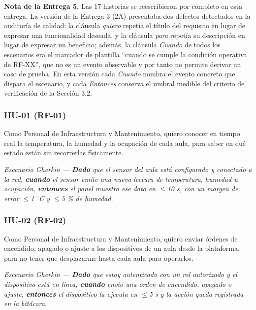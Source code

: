 \textbf{Nota de la Entrega 5.} Las 17 historias se reescribieron por completo en esta entrega. La versión de la Entrega 3 (2A) presentaba dos defectos detectados en la auditoría de calidad: la cláusula \emph{quiero} repetía el título del requisito en lugar de expresar una funcionalidad deseada, y la cláusula \emph{para} repetía su descripción en lugar de expresar un beneficio; además, la cláusula \emph{Cuando} de todos los escenarios era el marcador de plantilla ``cuando se cumple la condición operativa de RF-XX'', que no es un evento observable y por tanto no permite derivar un caso de prueba. En esta versión cada \emph{Cuando} nombra el evento concreto que dispara el escenario, y cada \emph{Entonces} conserva el umbral medible del criterio de verificación de la Sección 3.2.

\subsubsection*{HU-01 (RF-01)}


Como Personal de Infraestructura y Mantenimiento, quiero conocer en tiempo real la temperatura, la humedad y la ocupación de cada aula, para saber en qué estado están sin recorrerlas físicamente.

\textit{Escenario Gherkin --- \textbf{Dado} que el sensor del aula está configurado y conectado a la red, \textbf{cuando} el sensor emite una nueva lectura de temperatura, humedad u ocupación, \textbf{entonces} el panel muestra ese dato en $\leq$10 s, con un margen de error $\leq$1 $^{\circ}$C y $\leq$5 \% de humedad.}

\subsubsection*{HU-02 (RF-02)}


Como Personal de Infraestructura y Mantenimiento, quiero enviar órdenes de encendido, apagado o ajuste a los dispositivos de un aula desde la plataforma, para no tener que desplazarme hasta cada aula para operarlos.

\textit{Escenario Gherkin --- \textbf{Dado} que estoy autenticado con un rol autorizado y el dispositivo está en línea, \textbf{cuando} envío una orden de encendido, apagado o ajuste, \textbf{entonces} el dispositivo la ejecuta en $\leq$5 s y la acción queda registrada en la bitácora.}

